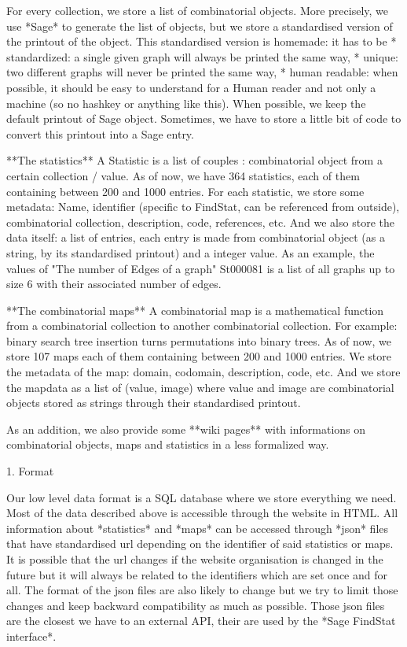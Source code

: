 \documentclass{deliverablereport}
\begin{document}
For every collection, we store a list of combinatorial objects. More precisely, we use *Sage* to generate the list of objects,
but we store a standardised version of the printout of the object. This standardised version is homemade: it has to be
* standardized: a single given graph will always be printed the same way,
* unique: two different graphs will never be printed the same way,
* human readable: when possible, it should be easy to understand for a Human reader and not only a machine (so no hashkey or anything like this).
When possible, we keep the default printout of Sage object. Sometimes, we have to store a little bit of code to convert this printout into a
Sage entry.

**The statistics** A Statistic is a list of couples : combinatorial object from a certain collection / value. As of now, we have 364 statistics,
each of them containing between 200 and 1000 entries. For each statistic, we store some metadata: Name, identifier
(specific to FindStat, can be referenced from outside), combinatorial collection, description, code, references, etc. And we also store the data itself: a list of entries,
each entry is made from combinatorial object (as a string, by its standardised printout) and a integer value. As an example, the values of "The number of Edges of a graph"
St000081 is a list of all graphs up to size 6 with their associated number of edges.

**The combinatorial maps** A combinatorial map is a mathematical function from a combinatorial collection to another combinatorial collection. For example: binary search
tree insertion turns permutations into binary trees. As of now, we store 107 maps each of them containing between 200 and 1000 entries. We store the metadata of the map: domain, codomain, description, code, etc. And we store the mapdata as a list of (value, image)
where value and image are combinatorial objects stored as strings through their standardised printout.

As an addition, we also provide some **wiki pages** with informations on combinatorial objects, maps and statistics in a less formalized way.

 1. Format

Our low level data format is a SQL database where we store everything we need. Most of the data described above is accessible through the website in HTML.
All information about *statistics* and *maps* can be accessed through *json* files that have standardised url depending on the identifier of said statistics or
maps. It is possible that the url changes if the website organisation is changed in the future but it will always be related to the identifiers which are set once and for all.
The format of the json files are also likely to change but we try to limit those changes and keep backward compatibility as much as possible. Those json files
are the closest we have to an external API, their are used by the *Sage FindStat interface*.
\end{document}
